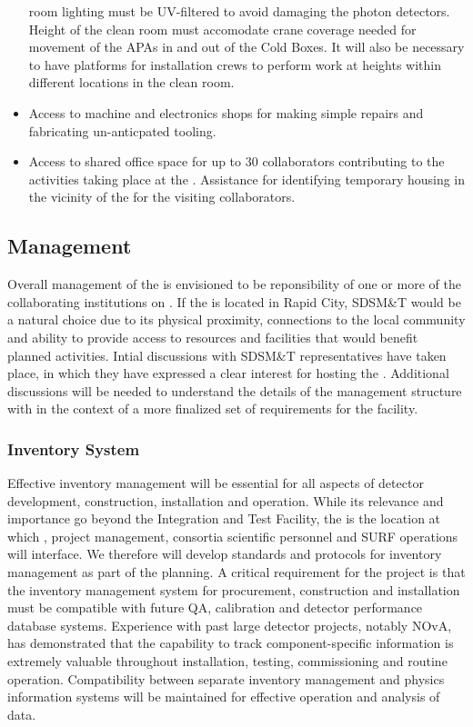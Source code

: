 \begin{itemize}
    room lighting must be UV-filtered to avoid damaging the photon detectors.
    Height of the clean room must accomodate crane coverage needed for movement 
    of the APAs in and out of the Cold Boxes.  It will also be necessary to have 
    platforms for installation crews to perform work at heights within different 
    locations in the clean room.    
  \item Access to machine and electronics shops for making simple repairs and 
    fabricating un-anticpated tooling.
  \item Access to shared office space for up to 30 collaborators contributing 
    to the activities taking place at the .  Assistance for identifying 
    temporary housing in the vicinity of the  for the visiting collaborators.        
\end{itemize}

\subsection{Management}

Overall management of the  is envisioned to be reponsibility of one or 
more of the collaborating institutions on .  If the  is located 
in Rapid City, SDSM\&T would be a natural choice due to its physical proximity, 
connections to the local community and ability to provide access to resources 
and facilities that would benefit planned  activities.  Intial discussions 
with SDSM\&T representatives have taken place, in which they have expressed a 
clear interest for hosting the .  Additional discussions will be needed to 
understand the details of the  management structure with in the context of 
a more finalized set of requirements for the facility.    

\subsubsection{Inventory System}

Effective inventory management will be essential for all aspects of
 detector development, construction, installation and
operation.  While its relevance and importance go beyond the
Integration and Test Facility, the  is the location at which
,  project management, consortia scientific
personnel and SURF operations will interface.  We therefore will
develop standards and protocols for inventory management as part of
the  planning.  A critical requirement for the project is that the
inventory management system for procurement, construction and
installation must be compatible with future QA, calibration and
detector performance database systems.  Experience with past large
detector projects, notably NOvA, has demonstrated that the capability
to track component-specific information is extremely valuable
throughout installation, testing, commissioning and routine operation.
Compatibility between separate inventory management and physics
information systems will be maintained for effective operation and
analysis of  data.
